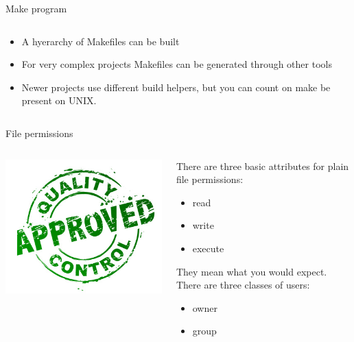 \documentclass[unknownkeysallowed, 10pt, a4 paper, handout]{beamer}
\begin{document}
\begin{frame}[label=makefile]{Make program}
\begin{columns}[T]
\begin{column}{.76\textwidth}
\begin{itemize}
\begin{itemize}
\begin{itemize}
          \end{itemize}
          \item A hyerarchy of Makefiles can be built
          \item For very complex projects Makefiles can be generated through
             other tools
          \item Newer projects use different build helpers, but you can count
             on make be present on UNIX.
        \end{itemize}
      \end{itemize}
    \end{column}
  \end{columns}
\end{frame}


\begin{frame}[label=permission]{File permissions}
  \begin{columns}[T]
    \begin{column}{.11\textwidth}
      \includegraphics[scale=0.15]{pics/Timbro.jpg}
    \end{column}
    \hfill
    \begin{column}{.89\textwidth}
      \small{
      There are three basic attributes for plain file permissions:
      \begin{itemize}
         \item read
         \item write
         \item execute
      \end{itemize}
      They mean what you would expect. There are three classes of users:
      \begin{itemize}
         \item owner
         \item group

\end{itemize}}
\end{column}
\end{columns}
\end{frame}
\end{document}
